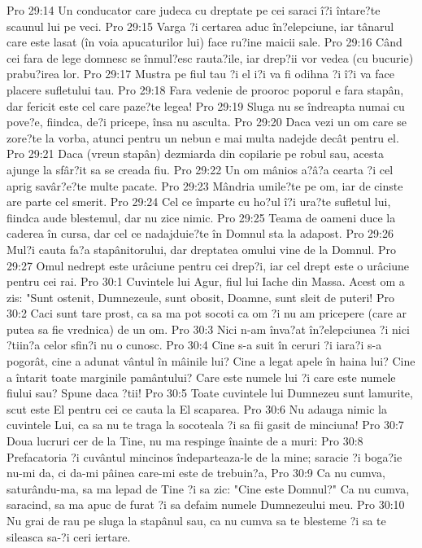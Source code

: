 Pro 29:14  Un conducator care judeca cu dreptate pe cei saraci î?i întare?te scaunul lui pe veci.
Pro 29:15  Varga ?i certarea aduc în?elepciune, iar tânarul care este lasat (în voia apucaturilor lui) face ru?ine maicii sale.
Pro 29:16  Când cei fara de lege domnesc se înmul?esc rauta?ile, iar drep?ii vor vedea (cu bucurie) prabu?irea lor.
Pro 29:17  Mustra pe fiul tau ?i el i?i va fi odihna ?i î?i va face placere sufletului tau.
Pro 29:18  Fara vedenie de prooroc poporul e fara stapân, dar fericit este cel care paze?te legea!
Pro 29:19  Sluga nu se îndreapta numai cu pove?e, fiindca, de?i pricepe, însa nu asculta.
Pro 29:20  Daca vezi un om care se zore?te la vorba, atunci pentru un nebun e mai multa nadejde decât pentru el.
Pro 29:21  Daca (vreun stapân) dezmiarda din copilarie pe robul sau, acesta ajunge la sfâr?it sa se creada fiu.
Pro 29:22  Un om mânios a?â?a cearta ?i cel aprig savâr?e?te multe pacate.
Pro 29:23  Mândria umile?te pe om, iar de cinste are parte cel smerit.
Pro 29:24  Cel ce împarte cu ho?ul î?i ura?te sufletul lui, fiindca aude blestemul, dar nu zice nimic.
Pro 29:25  Teama de oameni duce la caderea în cursa, dar cel ce nadajduie?te în Domnul sta la adapost.
Pro 29:26  Mul?i cauta fa?a stapânitorului, dar dreptatea omului vine de la Domnul.
Pro 29:27  Omul nedrept este urâciune pentru cei drep?i, iar cel drept este o urâciune pentru cei rai.
Pro 30:1  Cuvintele lui Agur, fiul lui Iache din Massa. Acest om a zis: "Sunt ostenit, Dumnezeule, sunt obosit, Doamne, sunt sleit de puteri!
Pro 30:2  Caci sunt tare prost, ca sa ma pot socoti ca om ?i nu am pricepere (care ar putea sa fie vrednica) de un om.
Pro 30:3  Nici n-am înva?at în?elepciunea ?i nici ?tiin?a celor sfin?i nu o cunosc.
Pro 30:4  Cine s-a suit în ceruri ?i iara?i s-a pogorât, cine a adunat vântul în mâinile lui? Cine a legat apele în haina lui? Cine a întarit toate marginile pamântului? Care este numele lui ?i care este numele fiului sau? Spune daca ?tii!
Pro 30:5  Toate cuvintele lui Dumnezeu sunt lamurite, scut este El pentru cei ce cauta la El scaparea.
Pro 30:6  Nu adauga nimic la cuvintele Lui, ca sa nu te traga la socoteala ?i sa fii gasit de minciuna!
Pro 30:7  Doua lucruri cer de la Tine, nu ma respinge înainte de a muri:
Pro 30:8  Prefacatoria ?i cuvântul mincinos îndeparteaza-le de la mine; saracie ?i boga?ie nu-mi da, ci da-mi pâinea care-mi este de trebuin?a,
Pro 30:9  Ca nu cumva, saturându-ma, sa ma lepad de Tine ?i sa zic: "Cine este Domnul?" Ca nu cumva, saracind, sa ma apuc de furat ?i sa defaim numele Dumnezeului meu.
Pro 30:10  Nu grai de rau pe sluga la stapânul sau, ca nu cumva sa te blesteme ?i sa te sileasca sa-?i ceri iertare.
